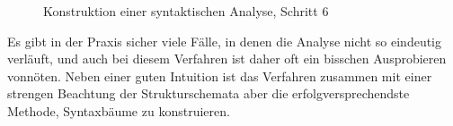 \begin{figure}[!htbp]
  \caption{Konstruktion einer syntaktischen Analyse, Schritt 6}
  \label{fig:sya06}
\end{figure}

Es gibt in der Praxis sicher viele Fälle, in denen die Analyse nicht so eindeutig verläuft, und auch bei diesem Verfahren ist daher oft ein bisschen Ausprobieren vonnöten.
Neben einer guten Intuition ist das Verfahren zusammen mit einer strengen Beachtung der Strukturschemata aber die erfolgversprechendste Methode, Syntaxbäume zu konstruieren.




\Uebungen

